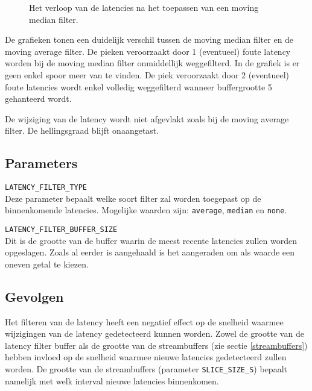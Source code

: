 \begin{figure}[!tbph]
	\centering
	\hfill
	\captionsetup{width=0.7\textwidth}
	\caption{Het verloop van de latencies na het toepassen van een moving median filter.}
\end{figure}

De grafieken tonen een duidelijk verschil tussen de moving median filter en de moving average filter. De pieken veroorzaakt door 1 (eventueel) foute latency worden bij de moving median filter onmiddellijk weggefilterd. In de grafiek is er geen enkel spoor meer van te vinden. De piek veroorzaakt door 2 (eventueel) foute latencies wordt enkel volledig weggefilterd wanneer buffergrootte 5 gehanteerd wordt.

De wijziging van de latency wordt niet afgevlakt zoals bij de moving average filter. De hellingsgraad blijft onaangetast.

\subsection{Parameters}

\begin{description}
	\item\texttt{LATENCY\_FILTER\_TYPE} \hfill \\
	Deze parameter bepaalt welke soort filter zal worden toegepast op de binnenkomende latencies. Mogelijke waarden zijn: \texttt{average}, \texttt{median} en \texttt{none}.
	
	\item\texttt{LATENCY\_FILTER\_BUFFER\_SIZE} \hfill \\
	Dit is de grootte van de buffer waarin de meest recente latencies zullen worden opgeslagen. Zoals al eerder is aangehaald is het aangeraden om als waarde een oneven getal te kiezen.

\end{description}

\subsection{Gevolgen}
\label{filter-gevolgen}

Het filteren van de latency heeft een negatief effect op de snelheid waarmee wijzigingen van de latency gedetecteerd kunnen worden. Zowel de grootte van de latency filter buffer als de grootte van de streambuffers (zie sectie \ref{streambuffers}) hebben invloed op de snelheid waarmee nieuwe latencies gedetecteerd zullen worden. De grootte van de streambuffers (parameter \texttt{SLICE\_SIZE\_S}) bepaalt namelijk met welk interval nieuwe latencies binnenkomen. 

